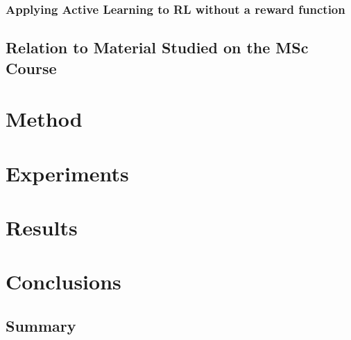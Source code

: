 \documentclass[11pt, a4paper, bibliography=totoc]{report}
\begin{document}
\subsection{Applying Active Learning to RL without a reward function}

\section{Relation to Material Studied on the MSc Course}

\chapter{Method}

\chapter{Experiments}

\chapter{Results}

\chapter{Conclusions}
\section{Summary}
\end{document}
